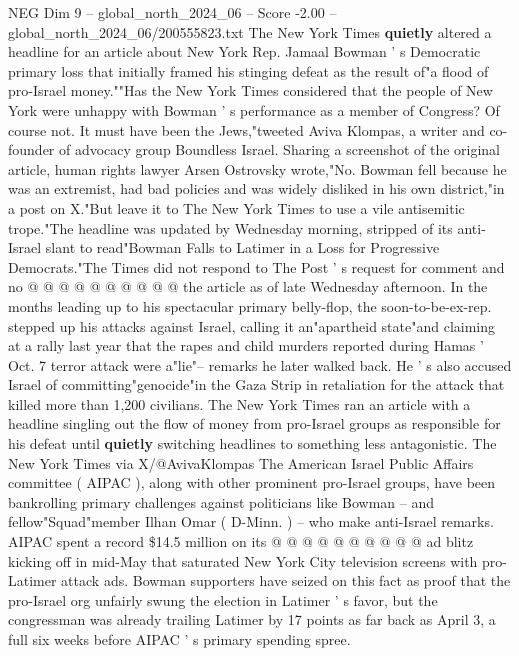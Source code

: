 \begin{textsample}{NEG Dim 9 – global\_north\_2024\_06 – Score -2.00 – global\_north\_2024\_06/200555823.txt}  \label{ex:f9_neg_169}
The New York Times \textbf{quietly} altered a headline for an article about New York Rep.
Jamaal Bowman ' s Democratic primary loss that initially framed his stinging defeat as the result of"a flood of pro-Israel money.""Has the New York Times considered that the people of New York were unhappy with Bowman ' s performance as a member of Congress?
Of course not.
It must have been the Jews,"tweeted Aviva Klompas, a writer and co-founder of advocacy group Boundless Israel.
Sharing a screenshot of the original article, human rights lawyer Arsen Ostrovsky wrote,"No.
Bowman fell because he was an extremist, had bad policies and was widely disliked in his own district,"in a post on X."But leave it to The New York Times to use a vile antisemitic trope."The headline was updated by Wednesday morning, stripped of its anti-Israel slant to read"Bowman Falls to Latimer in a Loss for Progressive Democrats."The Times did not respond to The Post ' s request for comment and no @ @ @ @ @ @ @ @ @ @ the article as of late Wednesday afternoon.
In the months leading up to his spectacular primary belly-flop, the soon-to-be-ex-rep. stepped up his attacks against Israel, calling it an"apartheid state"and claiming at a rally last year that the rapes and child murders reported during Hamas ' Oct. 7 terror attack were a"lie"-- remarks he later walked back.
He ' s also accused Israel of committing"genocide"in the Gaza Strip in retaliation for the attack that killed more than 1,200 civilians.
The New York Times ran an article with a headline singling out the flow of money from pro-Israel groups as responsible for his defeat until \textbf{quietly} switching headlines to something less antagonistic.
The New York Times via X/@AvivaKlompas The American Israel Public Affairs committee ( AIPAC ), along with other prominent pro-Israel groups, have been bankrolling primary challenges against politicians like Bowman -- and fellow"Squad"member Ilhan Omar ( D-Minn. ) -- who make anti-Israel remarks.
AIPAC spent a record \$14.5 million on its @ @ @ @ @ @ @ @ @ @ ad blitz kicking off in mid-May that saturated New York City television screens with pro-Latimer attack ads.
Bowman supporters have seized on this fact as proof that the pro-Israel org unfairly swung the election in Latimer ' s favor, but the congressman was already trailing Latimer by 17 points as far back as April 3, a full six weeks before AIPAC ' s primary spending spree.

\end{textsample}
